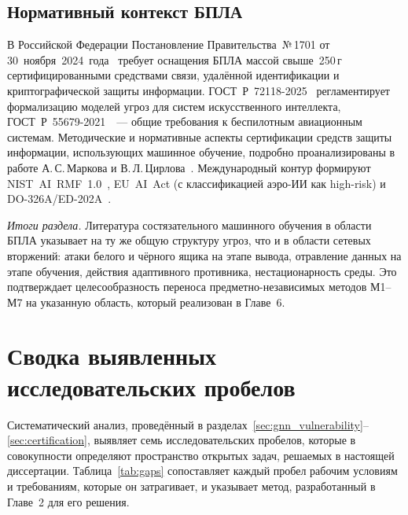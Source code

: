 \subsection{Нормативный контекст БПЛА}
В Российской Федерации Постановление Правительства~№\,1701 от
30~ноября~2024~года~\cite{decree_1701} требует оснащения БПЛА массой
свыше~250\,г сертифицированными средствами связи, удалённой
идентификации и криптографической защиты информации.
\mbox{ГОСТ~Р~72118-2025}~\cite{GOST_R_72118_2025} регламентирует
формализацию моделей угроз для систем искусственного интеллекта,
\mbox{ГОСТ~Р~55679-2021}~\cite{GOST_R_55679_2021}~--- общие требования
к беспилотным авиационным системам. Методические и нормативные
аспекты сертификации средств защиты информации, использующих
машинное обучение, подробно проанализированы в работе
А.\,С.\,Маркова и В.\,Л.\,Цирлова~\cite{Markov2023certify}. Международный контур
формируют \mbox{NIST~AI~RMF~1.0}~\cite{nist_rmf_2023},
\mbox{EU~AI~Act} (с классификацией аэро-ИИ как high-risk) и
\mbox{DO-326A/ED-202A}~\cite{do_326a_2024}.

\medskip
\noindent\textit{Итоги раздела.} Литература состязательного машинного
обучения в области БПЛА указывает на ту же общую структуру угроз, что
и в области сетевых вторжений: атаки белого и чёрного ящика на этапе
вывода, отравление данных на этапе обучения, действия адаптивного
противника, нестационарность среды. Это подтверждает целесообразность
переноса предметно-независимых методов \textsf{М1}--\textsf{М7} на
указанную область, который реализован в Главе~6.

\section{Сводка выявленных исследовательских пробелов}
\label{sec:gap_summary}

Систематический анализ, проведённый в разделах~\ref{sec:gnn_vulnerability}--\ref{sec:certification}, выявляет семь исследовательских пробелов, которые в совокупности определяют пространство открытых задач, решаемых в настоящей диссертации. Таблица~\ref{tab:gaps} сопоставляет каждый пробел рабочим условиям и требованиям, которые он затрагивает, и указывает метод, разработанный в Главе~2 для его решения.

